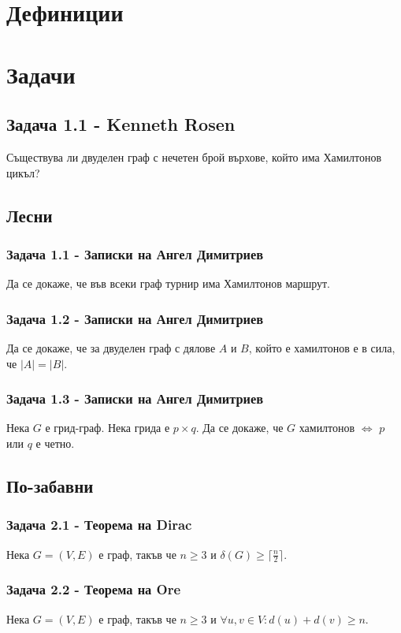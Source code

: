 \documentclass[12pt]{article}
\begin{document}
\section*{Дефиниции}

\section*{Задачи}
\subsection*{Задача 1.1 - Kenneth Rosen}
Съществува ли двуделен граф с нечетен брой върхове, който има Хамилтонов цикъл?

\subsection*{Лесни}
\subsubsection*{Задача 1.1 - Записки на Ангел Димитриев}
Да се докаже, че във всеки граф турнир има Хамилтонов маршрут.
\subsubsection*{Задача 1.2 - Записки на Ангел Димитриев}
Да се докаже, че за двуделен граф с дялове $A$ и $B$, който е хамилтонов е в сила, че $|A| = |B|$. \subsubsection*{Задача 1.3 - Записки на Ангел Димитриев}
Нека $G$ е грид-граф. Нека грида е $p \times q$. Да се докаже, че $G$ хамилтонов $\iff$ $p$ или $q$ е четно.



\subsection*{По-забавни}
\subsubsection*{Задача 2.1 - Теорема на Dirac}
Нека $G = (V, E)$ е граф, такъв че $n \geq 3$ и $\delta(G) \geq \lceil \frac{n}{2} \rceil$.
\subsubsection*{Задача 2.2 - Теорема на Ore}
Нека $G = (V, E)$ е граф, такъв че $n \geq 3$ и $\forall u, v \in V: d(u) + d(v) \geq n$.
\end{document}
